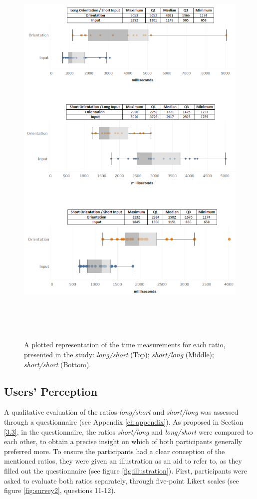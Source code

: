 \begin{figure}[t!]
\centering
\includegraphics[width=14cm, height=20cm]{Chapters/graphics/Times.png}
\caption{A plotted representation of the time measurements for each ratio, presented in the study: \textit{long/short} (Top);  \textit{short/long} (Middle); \textit{short/short} (Bottom).}
\label{fig:times}
\end{figure}

\subsection{Users' Perception}

A qualitative evaluation of the ratios \textit{long/short} and \textit{short/long} was assessed through a questionnaire (see Appendix \ref{ch:appendix}). As proposed in Section \ref{3.3}, in the questionnaire, the ratios \textit{short/long} and \textit{long/short} were compared to each other, to obtain a precise insight on which of both participants generally preferred more. To ensure the participants had a clear conception of the mentioned ratios, they were given an illustration as an aid to refer to, as they filled out the questionnaire (see figure \ref{fig:illustration}). First, participants were asked to evaluate both ratios separately, through five-point Likert scales (see figure \ref{fig:survey2}, questions 11-12). \\

